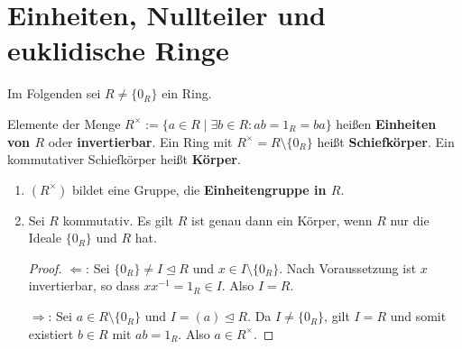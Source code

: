 \section{Einheiten, Nullteiler und euklidische Ringe}
Im Folgenden sei $R \neq \{0_R\}$ ein Ring.
\begin{definition}
	Elemente der Menge $R^\times := \{a \in R \mid \exists b \in R : ab = 1_R = ba\}$ heißen \textbf{Einheiten von $R$} oder \textbf{invertierbar}. Ein Ring mit $R^\times = R \setminus \{0_R\}$ heißt \textbf{Schiefkörper}. Ein kommutativer Schiefkörper heißt \textbf{Körper}.
\end{definition}
\begin{rem}\label{rem5_2}
	\begin{enumerate}[label=(\roman*)]
		\item $(R^\times)$ bildet eine Gruppe, die \textbf{Einheitengruppe in $R$}.
		\item Sei $R$ kommutativ. Es gilt $R$ ist genau dann ein Körper, wenn $R$ nur die Ideale $\{0_R\}$ und $R$ hat.
		\begin{proof}
			\glqq{}$\Leftarrow$\grqq: Sei $\{0_R\} \neq I \unlhd R$ und $x \in I \setminus \{0_R\}$. Nach Voraussetzung ist $x$ invertierbar, so dass $xx^{-1} = 1_R \in I$. Also $I=R$.
			
			\glqq{}$\Rightarrow$\grqq: Sei $a \in R \setminus \{0_R\}$ und $I = (a) \unlhd R$. Da $I \neq \{0_R\}$, gilt $I=R$ und somit existiert $b \in R$ mit $ab = 1_R$. Also $a \in R^\times$.
		\end{proof}
	\end{enumerate}
\end{rem}
